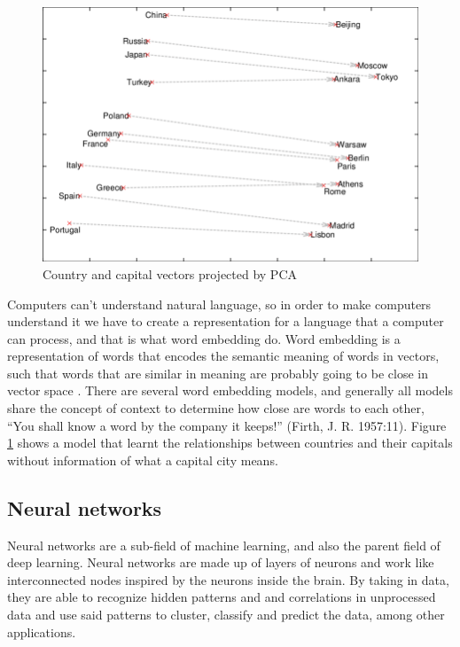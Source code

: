 \documentclass[12pt]{diazessay}
\newcounter{subsubsubsection}[subsubsection]
\begin{document}
            
            \begin{figure}[h]
                \centering
                \includegraphics[scale=0.42]{Figures/embeddings_fig.png}
                \caption{Country and capital vectors projected by PCA \cite{PCA_article}}
                \label{fig:wordembedding}
            \end{figure}
            
            Computers can’t understand natural language, so in order to make computers understand it we have to create a representation for a language that a computer can process, and that is what word embedding do. Word embedding is a representation of words that encodes the semantic meaning of words in vectors, such that words that are similar in meaning are probably going to be close in vector space \cite{jurafsky_martin_2000}. There are several word embedding models, and generally all models share the concept of context to determine how close are words to each other, “You shall know a word by the company it keeps!” (Firth, J. R. 1957:11). Figure \ref{fig:wordembedding} shows a model that learnt the relationships between countries and their capitals without information of what a capital city means.
    
        
    \subsection{Neural networks}
        Neural networks are a sub-field of machine learning, and also the parent field of deep learning. Neural networks are made up of layers of neurons and work like interconnected nodes inspired by the neurons inside the brain. By taking in data, they are able to recognize hidden patterns and and correlations in unprocessed data and use said patterns to cluster, classify and predict the data, among other applications.
        
\end{document}
